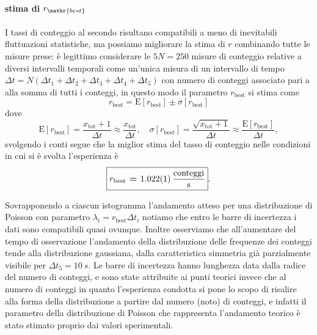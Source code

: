 \documentclass[10pt,oneside,a4paper]{article}
\begin{document}
\paragraph{stima di $r_\mathr{best}$}
I tassi di conteggio al secondo risultano compatibili a meno di inevitabili fluttuazioni statistiche, ma possiamo migliorare la stima di $r$ combinando tutte le misure prese: è legittimo considerare le $5 N = 250$ misure di conteggio relative a diversi intervalli temporali come un'unica misura di un intervallo di tempo $\Delta t = N ( \Delta t_1 + \Delta t_2 + \Delta t_3 + \Delta t_4 + \Delta t_5)$ con numero di conteggi associato pari a alla somma di tutti i conteggi, in questo modo il parametro $r_\mathrm{best}$ si stima come
\begin{equation}\label{eq:stima_r_tot}
	r_\mathrm{best} = \mathrm{E}[r_\mathrm{best}] \pm \sigma [r_\mathrm{best}]
\end{equation} dove
\[
	\mathrm{E}[r_\mathrm{best}] = \frac{x_{\mathrm{tot}} +1}{\Delta t} \approx \frac{x_{\mathrm{tot}}}{\Delta t}, \quad \sigma[r_\mathrm{best}] = \frac{\sqrt{x_{\mathrm{tot}} +1}}{\Delta t} \approx  \frac{\mathrm{E}[r_\mathrm{best}]}{\Delta t},
\] svolgendo i conti segue che la miglior stima del tasso di conteggio nelle condizioni in cui si è svolta l'esperienza è 
\[
	\boxed{\textbf{$r_\mathrm{best}$ = {\SI{1.022 \pm 0,001}{\frac{conteggi}{s}}}}}.
\]

Sovrapponendo a ciascun istogramma l'andamento atteso per una distribuzione di Poisson con parametro $\lambda_i = r_{\mathrm{best}} \Delta t_i$ notiamo che entro le barre di incertezza i dati sono compatibili quasi ovunque. Inoltre osserviamo che all'aumentare del tempo di osservazione l'andamento della distribuzione delle frequenze dei conteggi tende alla distribuzione gaussiana, dalla caratteristica simmetria già parzialmente visibile per $\Delta t_5 = \SI{10}{s}$. Le barre di incertezza hanno lunghezza data dalla radice del numero di conteggi, e sono state attribuite ai punti teorici invece che al numero di conteggi in quanto l'esperienza condotta si pone lo scopo di risalire alla forma della distribuzione a partire dal numero (noto) di conteggi, e infatti il parametro della distribuzione di Poisson che rappresenta l'andamento teorico è stato stimato proprio dai valori sperimentali.
\end{document}
